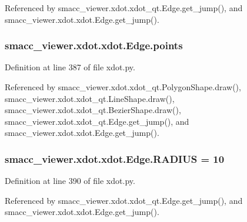 Referenced by smacc\+\_\+viewer.\+xdot.\+xdot\+\_\+qt.\+Edge.\+get\+\_\+jump(), and smacc\+\_\+viewer.\+xdot.\+xdot.\+Edge.\+get\+\_\+jump().

\subsubsection[{\texorpdfstring{points}{points}}]{\setlength{\rightskip}{0pt plus 5cm}smacc\+\_\+viewer.\+xdot.\+xdot.\+Edge.\+points}\hypertarget{classsmacc__viewer_1_1xdot_1_1xdot_1_1Edge_ad3f042ee88c18f56adff36941ae9be3d}{}\label{classsmacc__viewer_1_1xdot_1_1xdot_1_1Edge_ad3f042ee88c18f56adff36941ae9be3d}


Definition at line 387 of file xdot.\+py.



Referenced by smacc\+\_\+viewer.\+xdot.\+xdot\+\_\+qt.\+Polygon\+Shape.\+draw(), smacc\+\_\+viewer.\+xdot.\+xdot\+\_\+qt.\+Line\+Shape.\+draw(), smacc\+\_\+viewer.\+xdot.\+xdot\+\_\+qt.\+Bezier\+Shape.\+draw(), smacc\+\_\+viewer.\+xdot.\+xdot\+\_\+qt.\+Edge.\+get\+\_\+jump(), and smacc\+\_\+viewer.\+xdot.\+xdot.\+Edge.\+get\+\_\+jump().

\subsubsection[{\texorpdfstring{R\+A\+D\+I\+US}{RADIUS}}]{ smacc\+\_\+viewer.\+xdot.\+xdot.\+Edge.\+R\+A\+D\+I\+US = 10\hspace{0.3cm}{\ttfamily [static]}}\hypertarget{classsmacc__viewer_1_1xdot_1_1xdot_1_1Edge_a13af40bbc8e6a64e08c4d3a76afde6ec}{}\label{classsmacc__viewer_1_1xdot_1_1xdot_1_1Edge_a13af40bbc8e6a64e08c4d3a76afde6ec}


Definition at line 390 of file xdot.\+py.



Referenced by smacc\+\_\+viewer.\+xdot.\+xdot\+\_\+qt.\+Edge.\+get\+\_\+jump(), and smacc\+\_\+viewer.\+xdot.\+xdot.\+Edge.\+get\+\_\+jump().

